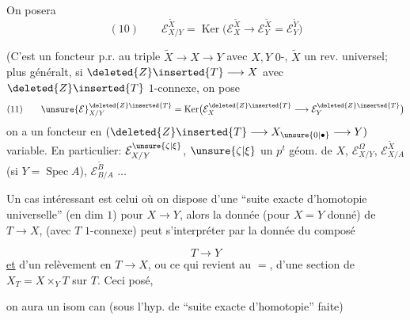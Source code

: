 On posera
\[
(10)\qquad \mathcal E_{X/Y}^{\widetilde X}=\operatorname{Ker}\bigl(\mathcal E_X^{\widetilde X}\longrightarrow\mathcal E_Y^{\widetilde X}=\mathcal E_Y^{\widetilde Y}\bigr)
\]



(C'est un foncteur p.r. au triple $\widetilde X\longrightarrow X\longrightarrow Y$ avec $X,Y$ $0$-, $\widetilde X$ un rev. universel; plus généralt, si $\deleted{Z}\inserted{T}\longrightarrow X$ avec $\deleted{Z}\inserted{T}$ $1$-connexe, on pose
\[
(11)\qquad \unsure{\mathcal E}_{X/Y}^{\deleted{Z}\inserted{T}}=\operatorname{Ker}\bigl(\mathcal E_X^{\deleted{Z}\inserted{T}}\longrightarrow\mathcal E_Y^{\deleted{Z}\inserted{T}}\bigr)
\]
on a un foncteur en  $(\deleted{Z}\inserted{T}\longrightarrow X_{\unsure{0|\bullet}}\longrightarrow Y)$ variable. En particulier: $\mathcal E_{X/Y}^{\unsure{\zeta|\xi}}$, $\unsure{\zeta|\xi}$ un $p^t$ géom. de $X$, $\mathcal E_{X/Y}^{\Omega}$, $\mathcal E_{X/A}^{\widetilde X}$ (si $Y=\operatorname{Spec} A$), $\mathcal E_{B/A}^{\widetilde B}$ $\ldots$


Un cas intéressant est celui où on dispose d'une ``suite exacte d'homotopie universelle''  (en dim $1$) pour $X\longrightarrow Y$, alors la donnée (pour $X=Y$ donné) de $T\longrightarrow X$, (avec $T$ $1$-connexe) peut s'interpréter par la donnée du composé



\[
T\longrightarrow Y
\]
\uline{et} d'un relèvement en $T\longrightarrow X$, ou ce qui revient au $=$, d'une section de $X_T=X\times_YT$ sur $T$. Ceci posé,

\noindent
\begin{minipage}[t]{0.48\linewidth}
\vspace*{\baselineskip}
\end{minipage}\hfill
\begin{minipage}[t]{0.48\linewidth}
on aura un isom can (sous l'hyp. de ``suite exacte d'homotopie'' \deleted{\unsure{)}} faite)
\end{minipage}

